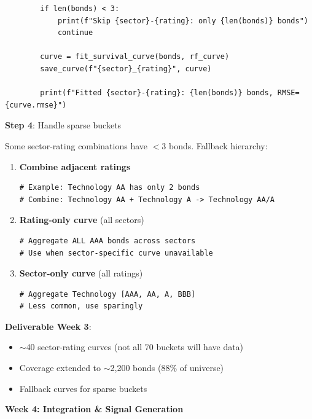 \documentclass[11pt,a4paper]{article}
\begin{document}
\begin{implbox}
\begin{lstlisting}
        if len(bonds) < 3:
            print(f"Skip {sector}-{rating}: only {len(bonds)} bonds")
            continue
        
        curve = fit_survival_curve(bonds, rf_curve)
        save_curve(f"{sector}_{rating}", curve)
        
        print(f"Fitted {sector}-{rating}: {len(bonds)} bonds, RMSE={curve.rmse}")
\end{lstlisting}

\textbf{Step 4}: Handle sparse buckets

Some sector-rating combinations have $< 3$ bonds. Fallback hierarchy:

\begin{enumerate}
    \item \textbf{Combine adjacent ratings}
    \begin{lstlisting}
# Example: Technology AA has only 2 bonds
# Combine: Technology AA + Technology A -> Technology AA/A
    \end{lstlisting}
    
    \item \textbf{Rating-only curve} (all sectors)
    \begin{lstlisting}
# Aggregate ALL AAA bonds across sectors
# Use when sector-specific curve unavailable
    \end{lstlisting}
    
    \item \textbf{Sector-only curve} (all ratings)
    \begin{lstlisting}
# Aggregate Technology [AAA, AA, A, BBB]
# Less common, use sparingly
    \end{lstlisting}
\end{enumerate}
\end{implbox}

\textbf{Deliverable Week 3}:
\begin{itemize}
    \item $\sim$40 sector-rating curves (not all 70 buckets will have data)
    \item Coverage extended to $\sim$2,200 bonds (88\% of universe)
    \item Fallback curves for sparse buckets
\end{itemize}

\vspace{0.5cm}

\textbf{Week 4: Integration \& Signal Generation}
\end{document}
